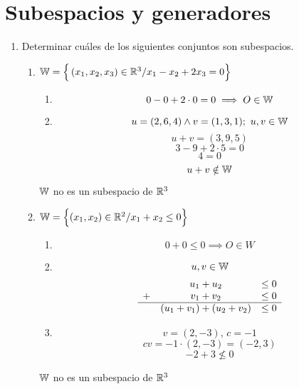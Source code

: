 \documentclass[../practica.root.tex]{subfiles}
\begin{document}
\setcounter{section}{3}
\section{Subespacios y generadores}

\begin{enumerate}
    \item Determinar cuáles de los siguientes conjuntos son subespacios.
          \begin{enumerate}
              \item $ \mathbb{W} = \Big\{ \left(x_1, x_2, x_3\right) \in \mathbb{R}^3 / x_1 - x_2 + 2x_3 = 0 \Big\} $
                    \begin{enumerate}
                        \item \[ 0 - 0 + 2 \cdot 0 = 0 \implies O \in \mathbb{W} \]
                        \item \[ u = (2,6,4) \land v = (1,3,1);\ u, v \in \mathbb{W} \]
                              \[ u + v = (3,9,5) \]
                              \[ 3 - 9 + 2 \cdot 5 = 0 \]
                              \[ 4 = 0 \]
                              \[ u+v \notin \mathbb{W} \]
                    \end{enumerate}
                    $\mathbb{W}$ no es un subespacio de $\mathbb{R}^3$
              \item $ \mathbb{W} = \Big\{ (x_1, x_2) \in \mathbb{R}^2 / x_1 + x_2 \le 0 \Big\} $
                    \begin{enumerate}
                        \item \[ 0 + 0 \le 0 \implies O \in W \]
                        \item \[ u, v \in \mathbb{W} \]
                              \[
                                  \begin{array}{lcc}
                                        & u_1 + u_2                 & \le 0 \\
                                      + & v_1 + v_2                 & \le 0 \\
                                      \hline
                                        & (u_1 + v_1) + (u_2 + v_2) & \le 0
                                  \end{array}
                              \]
                        \item \[ v = (2, -3) \text{, } c = -1 \]
                              \[ cv = -1\cdot(2, -3) = (-2, 3) \]
                              \[ -2 + 3 \nleq 0 \]
                    \end{enumerate}
                    $\mathbb{W}$ no es un subespacio de $\mathbb{R}^3$

\end{enumerate}
\end{enumerate}
\end{document}
